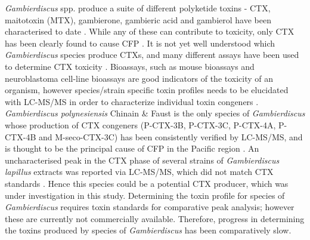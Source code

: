 \documentclass[12pt]{article}
\begin{document}
\emph{Gambierdiscus} spp. produce a suite of different polyketide toxins - CTX, maitotoxin (MTX), gambierone, gambieric acid and gambierol have been characterised to date \citep{satake1993gambierol,nagai1992gambieric,rodriguez2015gambierone,murata1993structure,murata1989structures}. While any of these can contribute to toxicity, only CTX has been clearly found to cause CFP \citep{chinain1997intraspecific,holmes1998gambierdiscus}. It is not yet well understood which \textit{Gambierdiscus} species produce CTXs, and many different assays have been used to determine CTX toxicity \citep{globalcig}. Bioassays, such as mouse bioassays and neuroblastoma cell-line bioassays are good indicators of the toxicity of an organism, however species/strain specific toxin profiles needs to be elucidated with LC-MS/MS in order to characterize individual toxin congeners \citep{diogened2014chemistry}. \textit{Gambierdiscus polynesiensis} Chinain \& Faust is the only species of \emph{Gambierdiscus} whose production of CTX congeners (P-CTX-3B, P-CTX-3C, P-CTX-4A, P-CTX-4B and M-seco-CTX-3C) has been consistently verified by LC-MS/MS, and is thought to be the principal cause of CFP in the Pacific region \citep{chinain2010growth,rhodes2014production}.
An uncharacterised peak in the CTX phase of several strains of \emph{Gambierdiscus lapillus} extracts was reported via LC-MS/MS, which did not match CTX standards \cite{kretzschmar2016characterization}. Hence this species could be a potential CTX producer, which was under investigation in this study.
Determining the toxin profile for species of \textit{Gambierdiscus} requires toxin standards for comparative peak analysis; however these are currently not commercially available. Therefore, progress in determining the toxins produced by species of \emph{Gambierdiscus} has been comparatively slow.\\

\end{document}
